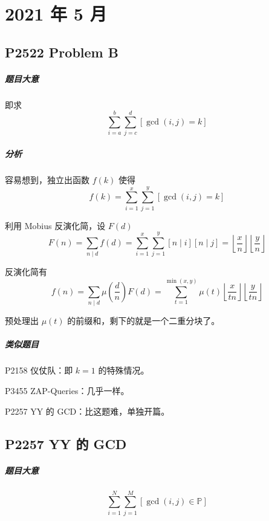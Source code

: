\chapter{2021 年 5 月}

\section{P2522 Problem B}

\paragraph{题目大意}

即求
\[ \sum_{i=a}^b \sum_{j=c}^d [\gcd(i,j) = k] \]

\paragraph{分析}

容易想到，独立出函数 $f(k)$ 使得
\[ f(k) = \sum_{i=1}^x \sum_{j=1}^y [\gcd(i,j) = k] \]

利用 Mobius 反演化简，设 $F(d)$
\[ F(n) = \sum_{n \mid d} f(d) = \sum_{i=1}^x \sum_{j=1}^y [n \mid i][n \mid j] = \left\lfloor \frac{x}{n} \right\rfloor \left\lfloor \frac{y}{n} \right\rfloor \]

反演化简有
\[ f(n) = \sum_{n \mid d} \mu\left(\frac{d}{n}\right)F(d) = \sum_{t=1}^{\min(x,y)} \mu(t) \left\lfloor \frac{x}{tn} \right\rfloor \left\lfloor \frac{y}{tn} \right\rfloor \]

预处理出 $\mu(t)$ 的前缀和，剩下的就是一个二重分块了。

\paragraph{类似题目}

P2158 仪仗队：即 $k = 1$ 的特殊情况。

P3455 ZAP-Queries：几乎一样。

P2257 YY 的 GCD：比这题难，单独开篇。

\section{P2257 YY 的 GCD}

\paragraph{题目大意}
\[ \sum_{i=1}^N \sum_{j=1}^M [\gcd(i,j) \in \mathbb{P}] \]

